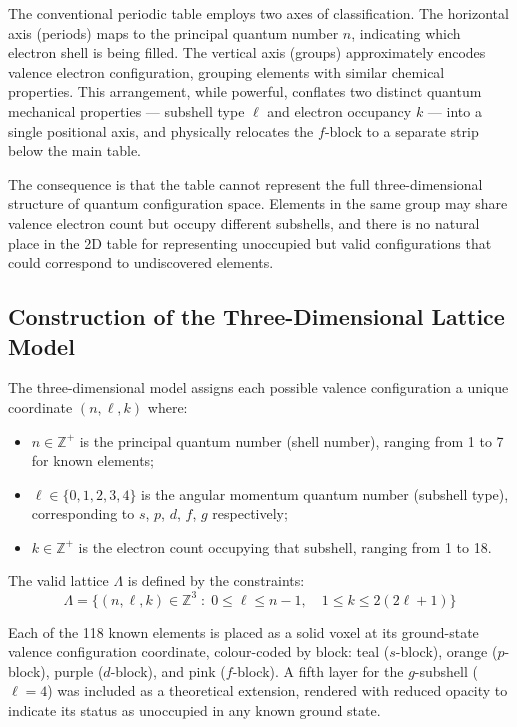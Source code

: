 \documentclass[12pt, a4paper]{article}
\newcommand{\Lattice}{\Lambda}           %
\begin{document}
The conventional periodic table employs two axes of classification. The horizontal axis
(periods) maps to the principal quantum number $n$, indicating which electron shell is being
filled. The vertical axis (groups) approximately encodes valence electron configuration,
grouping elements with similar chemical properties. This arrangement, while powerful,
conflates two distinct quantum mechanical properties --- subshell type $\ell$ and electron
occupancy $k$ --- into a single positional axis, and physically relocates the $f$-block to a
separate strip below the main table.

The consequence is that the table cannot represent the full three-dimensional structure of
quantum configuration space. Elements in the same group may share valence electron count
but occupy different subshells, and there is no natural place in the 2D table for representing
unoccupied but valid configurations that could correspond to undiscovered elements.

\subsection{Construction of the Three-Dimensional Lattice Model}

The three-dimensional model assigns each possible valence configuration a unique
coordinate $(n, \ell, k)$ where:
\begin{itemize}[leftmargin=2em]
  \item $n \in \mathbb{Z}^{+}$ is the principal quantum number (shell number),
        ranging from 1 to 7 for known elements;
  \item $\ell \in \{0, 1, 2, 3, 4\}$ is the angular momentum quantum number
        (subshell type), corresponding to $s$, $p$, $d$, $f$, $g$ respectively;
  \item $k \in \mathbb{Z}^{+}$ is the electron count occupying that subshell,
        ranging from 1 to 18.
\end{itemize}

The valid lattice $\Lattice$ is defined by the constraints:
\begin{equation}
  \Lattice = \bigl\{(n,\ell,k) \in \mathbb{Z}^{3}
             \;:\; 0 \le \ell \le n-1,\quad 1 \le k \le 2(2\ell+1)\bigr\}
  \label{eq:lattice}
\end{equation}

Each of the 118 known elements is placed as a solid voxel at its ground-state valence
configuration coordinate, colour-coded by block: teal ($s$-block), orange ($p$-block),
purple ($d$-block), and pink ($f$-block). A fifth layer for the $g$-subshell ($\ell = 4$) was
included as a theoretical extension, rendered with reduced opacity to indicate its status as
unoccupied in any known ground state.
\end{document}
